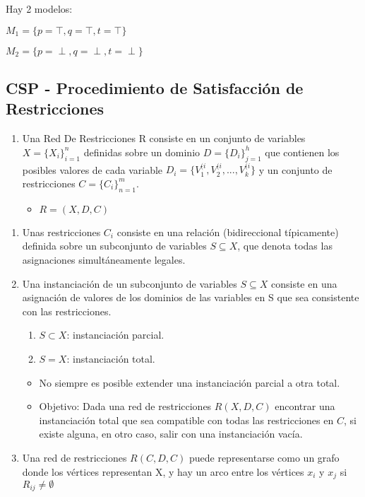 \documentclass[12pt, twoside, openright]{report} %
\begin{document}
Hay 2 modelos:

$M_1= \{ p= \top, q=\top, t=\top \}$

$M_2= \{ p= \perp, q=\perp, t=\perp \}$

\subsection{CSP - Procedimiento de Satisfacción de Restricciones}

\begin{enumerate}
	\def\labelenumi{\arabic{enumi}.}
	\item Una Red De Restricciones R consiste en un conjunto de variables
	      \(X=\{ X_i \}^n_{i=1}\) definidas sobre un dominio
	      \(D=\{ D_i \}^h_{j=1}\) que contienen los posibles valores de cada
	      variable \(D_i=\{ V_1^{(i}, V_2^{(i}, ..., V_k^{(i} \}\) y un
	      conjunto de restricciones \(C=\{ C_i \}^m_{n=1}\).

	      \begin{itemize}
		      \item \(R = (X, D, C)\)
	      \end{itemize}
\end{enumerate}


\begin{enumerate}
	\def\labelenumi{\arabic{enumi}.}
	\setcounter{enumi}{1}
	\item Unas restricciones \(C_i\) consiste en una relación (bidireccional
	      típicamente) definida sobre un subconjunto de variables
	      \(S \subseteq X\), que denota todas las asignaciones simultáneamente
	      legales.
	\item Una instanciación de un subconjunto de variables \(S \subseteq X\)
	      consiste en una asignación de valores de los dominios de las
	      variables en S que sea consistente con las restricciones.

	      \begin{enumerate}
		      \item \(S \subset X\): instanciación parcial.
		      \item \(S = X\): instanciación total.
	      \end{enumerate}


	      \begin{itemize}
		      \item No siempre es posible extender una instanciación parcial a otra
		            total.
		      \item Objetivo: Dada una red de restricciones \(R(X, D, C)\) encontrar una
		            instanciación total que sea compatible con todas las restricciones en
		            \(C\), si existe alguna, en otro caso, salir con una instanciación
		            vacía.
	      \end{itemize}
	\item Una red de restricciones \(R(C, D, C)\) puede representarse como un
	      grafo donde los vértices representan X, y hay un arco entre los
	      vértices \(x_i\) y \(x_j\) si \(R_{ij} \neq \emptyset\)

\end{enumerate}
\end{document}
